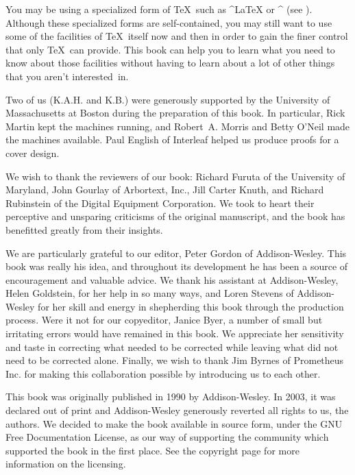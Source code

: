 {\tighten You may be using a specialized form of \TeX\ such as ^{\LaTeX}
or ^{\AMSTeX} (see ).  Although these specialized forms
are self-contained, you may still want to use some of the facilities of
\TeX\ itself now and then in order to gain the finer control that only
\TeX\ can provide.  This book can help you to learn what you need to
know about those facilities without having to learn about a lot of other
things that you aren't interested~in.  \par}

Two of us (K.A.H. and K.B.) were generously supported by the
University of Massachusetts at Boston during the preparation of this
book.  In particular, Rick Martin kept the machines running, and
Robert~A. Morris and Betty O'Neil made the machines available.  Paul
English of Interleaf helped us produce proofs for a cover design.

We wish to thank the reviewers of our book: Richard Furuta of the
University of Maryland, John Gourlay of Arbortext, Inc., Jill Carter
Knuth, and Richard Rubinstein of the Digital Equipment Corporation. We
took to heart their perceptive and unsparing criticisms of the original
manuscript, and the book has benefitted greatly from their insights.

We are particularly grateful to our editor, Peter Gordon of
Addison-Wesley.  This book was really his idea, and throughout its
development he has been a source of encouragement and valuable
advice.  We thank his assistant at Addison-Wesley, Helen Goldstein, for
her help in so many ways, and Loren Stevens of Addison-Wesley for her
skill and energy in shepherding this book through the production
process.  Were it not for our copyeditor, Janice Byer, a number of small
but irritating errors would have remained in this book.  We appreciate
her sensitivity and taste in correcting what needed to be corrected
while leaving what did not need to be corrected alone.  Finally, we wish
to thank Jim Byrnes of Prometheus Inc. for making this collaboration
possible by introducing us to each other.
\baselineskip


\baselineskip

 This book was originally
published in 1990 by Addison-Wesley.  In 2003, it was declared out of
print and Addison-Wesley generously reverted all rights to us, the
authors.  We decided to make the book available in source form, under
the GNU Free Documentation License, as our way of supporting the
community which supported the book in the first place.  See the
copyright page for more information on the licensing.

